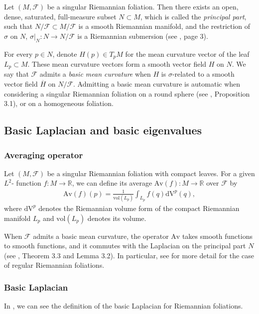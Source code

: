 \documentclass[11pt]{amsart}
\def\vol{\mathrm{vol}}
\def\av{\mathrm{Av}}
\def\dv{\mathrm{dV}}
\begin{document}
Let $(M,\mathcal{F})$ be a singular Riemannian foliation. Then there exists an open, dense, saturated, full-measure subset $N\subset M$, which is called the \textit{principal part}, such that $N/\mathcal{F}\subset M/\mathcal{F}$ is a smooth Riemannian manifold, and the restriction of $\sigma$ on $N$, $\sigma|_N:N\to N/\mathcal{F}$ is a Riemannian submersion (see \cite{radeslyt}, page 3).

For every $p\in N$, denote $H(p)\in T_pM$ for the mean curvature vector of the leaf $L_p\subset M$. These mean curvature vectors form a smooth vector field $H$ on $N$. We say that $\mathcal{F}$ admits a \textit{basic mean curvature} when $H$ is $\sigma$-related to a smooth vector field $\overline{H}$ on $N/\mathcal{F}$.
Admitting a basic mean curvature is automatic when considering a singular Riemannian foliation on a round sphere (see \cite{radeslyt}, Proposition 3.1), or on a homogeneous foliation.





\subsection{Basic Laplacian and basic eigenvalues}

\subsubsection{Averaging operator}\label{7}

Let $(M,\mathcal{F})$ be a singular Riemannian foliation with compact leaves. For a given $L^2$- function $f:M\to\mathbb{R}$, we can define its average $\av(f):M\to\mathbb{R}$ over $\mathcal{F}$ by
\begin{align*}
    \av(f)(p)=\frac{1}{\vol(L_p)}\int_{ L_p}f(q)\dv^p(q),
\end{align*}where $\dv^p$ denotes the Riemannian volume form of the compact Riemannian manifold $L_p$ and $\vol(L_p)$ denotes its volume.

When $\mathcal{F}$ admits a basic mean curvature, the operator $\av$ takes smooth functions to smooth functions, and it commutes with the Laplacian on the principal part $N$ (see \cite{radeslyt}, Theorem 3.3 and Lemma 3.2). In particular, see \cite{parken} for more detail for the case of regular Riemannian foliations.


\subsubsection{Basic Laplacian}
In \cite{parken}, we can see the definition of the basic Laplacian for Riemannian foliations. 
\end{document}
